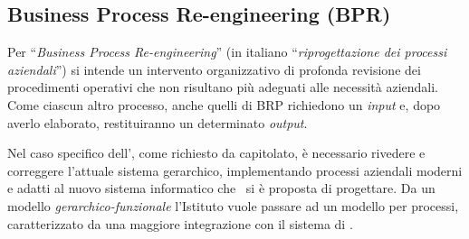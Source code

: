 
	\newpage
	\subsection{Business Process Re-engineering (BPR)}\label{sec:desc_bpr}
		
		Per ``\textit{Business Process Re-engineering}'' (in italiano ``\textit{riprogettazione dei processi aziendali}'') si intende un intervento organizzativo di profonda revisione dei procedimenti operativi che non risultano più adeguati alle necessità aziendali.
		Come ciascun altro processo, anche quelli di BRP richiedono un \textit{input} e, dopo averlo elaborato, restituiranno un determinato \textit{output}.
		
		Nel caso specifico dell'\istituto, come richiesto da capitolato, è necessario rivedere e correggere l'attuale sistema gerarchico, implementando processi aziendali moderni e adatti al nuovo sistema informatico che \azienda~si è proposta di progettare.
		Da un modello \textit{gerarchico-funzionale} l'Istituto vuole passare ad un modello per processi, caratterizzato da una maggiore integrazione con il sistema di \helpdesk.
	
